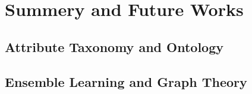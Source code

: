 
\chapter{Summery and Future Works}

\section{Attribute Taxonomy and Ontology}

\section{Ensemble Learning and Graph Theory}
